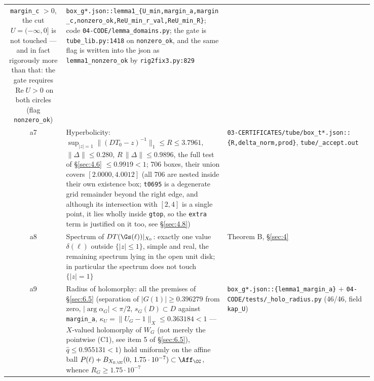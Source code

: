 {\begin{longtable}{@{}c>{\raggedright\arraybackslash}p{0.44\linewidth}>{\raggedright\arraybackslash}p{0.40\linewidth}@{}}
\texttt{margin\_c} $> 0$, the cut $U=(-\infty,0]$ is not touched --- and in fact
rigorously more than that: the gate requires $\operatorname{Re}U>0$ on both
circles (flag \texttt{nonzero\_ok}) &
\texttt{box\_\allowbreak g*.json::\allowbreak lemma1\_\allowbreak \{U\_\allowbreak min,margin\_\allowbreak a,margin\_\allowbreak c,nonzero\_\allowbreak ok,ReU\_\allowbreak min\_\allowbreak r\_\allowbreak val,ReU\_\allowbreak min\_\allowbreak R\}};
code \texttt{04-\allowbreak CODE/\allowbreak lemma\_\allowbreak domains.py}; the gate is \texttt{tube\_\allowbreak lib.py:1418}
on \texttt{nonzero\_ok}, and the same flag is written into the json as
\texttt{lemma1\_\allowbreak nonzero\_\allowbreak ok} by \texttt{rig2fix3.py:829} \\
a7 & Hyperbolicity: $\sup_{\lvert z\rvert=1}\|(DT_0-z)^{-1}\|_1\le R\le3.7961$,
$\|\Delta\|\le0.280$, $R\,\|\Delta\|\le0.9896$, the full test of \S\ref{sec:4.6}
$\le0.9919<1$; 706 boxes, their union covers $[2.0000,4.0012]$ (all 706 are nested inside their own existence box; \texttt{t0695} is a degenerate grid remainder beyond the right edge, and although its intersection with $[2,4]$ is a single point, it lies wholly inside \texttt{gtop}, so the \texttt{extra} term is justified on it too, see \S\ref{sec:4.8}) &
\texttt{03-\allowbreak CERTIFICATES/\allowbreak tube/\allowbreak box\_\allowbreak t*.json::\allowbreak \{R,delta\_\allowbreak norm,prod\}},
\texttt{tube/\allowbreak \_\allowbreak accept.out} \\
a8 & Spectrum of $DT(\Gs(\ell))\rvert_{X_0}$: exactly one value
$\delta(\ell)$ outside $\{\lvert z\rvert\le1\}$, simple and real, the
remaining spectrum lying in the open unit disk; in particular the spectrum
does not touch $\{\lvert z\rvert=1\}$ & Theorem B, \S\ref{sec:4} \\
a9 & Radius of holomorphy: all the premises of \S\ref{sec:6.5} (separation of
$\lvert G(1)\rvert\ge0.396279$ from zero, $\lvert\arg\alpha_G\rvert<\pi/2$,
$s_G(D) \subset D$ against \texttt{margin\_a},
$\kappa_U=\|U_G-1\|_X\le0.363184<1$ --- $X$-valued holomorphy of $W_G$ (not
merely the pointwise (C1), see item 5 of \S\ref{sec:6.5}), $\hat q\le0.955131<1$) hold
uniformly on the affine ball
$P(\ell)+B_{X_{0,\CC}}(0,\,1.75\cdot10^{-7})\subset\Aff_{\CC}$,
whence $R_G\ge1.75\cdot10^{-7}$ &
\texttt{box\_\allowbreak g*.json::\allowbreak \{lemma1\_\allowbreak margin\_\allowbreak a\}} +
\texttt{04-\allowbreak CODE/\allowbreak tests/\allowbreak \_\allowbreak holo\_\allowbreak radius.py} (46/46, field \texttt{kap\_U}) \\
\end{longtable}
}

